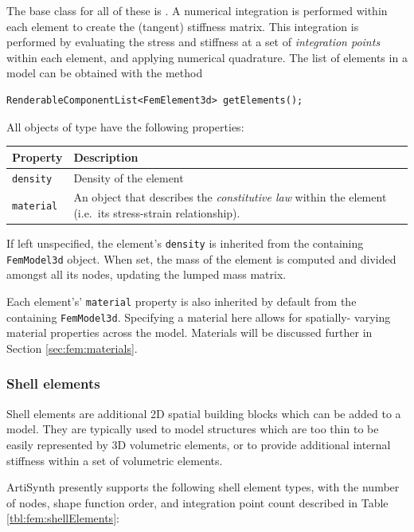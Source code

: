 The base class for all of these is .  A numerical integration is performed within each element
to create the (tangent) stiffness matrix.  This integration is performed
by evaluating the stress and stiffness at a set of \emph{integration points}
within each element, and applying numerical quadrature.  The list of elements
in a model can be obtained with the method
\begin{lstlisting}[]
  RenderableComponentList<FemElement3d> getElements();
\end{lstlisting}

All objects of type  have the 
following properties:
\begin{center}
\begin{tabular}{|ll|}
  \hline
  Property & Description\\
  \hline
  {\tt density} & Density of the element\\
  {\tt material} & An object that describes the \emph{constitutive law} 
                   within the element (i.e.~its stress-strain 
                   relationship).\\
  \hline
\end{tabular}
\end{center}

If left unspecified, the element's {\tt density} is inherited from the 
containing {\tt FemModel3d} object.  When set, the mass of the element is
computed and divided amongst all its nodes, updating the lumped mass
matrix.

Each element's' {\tt material} property is also inherited by default from the 
containing {\tt FemModel3d}. Specifying a material here allows for spatially-%
varying material properties across the model.  Materials will be discussed
further in Section \ref{sec:fem:materials}.

\subsubsection{Shell elements}

Shell elements are additional 2D spatial building blocks which can be
added to a model. They are typically used to model structures which
are too thin to be easily represented by 3D volumetric elements, or to
provide additional internal stiffness within a set of volumetric
elements.

ArtiSynth presently supports the following shell element types, with
the number of nodes, shape function order, and integration point count
described in Table \ref{tbl:fem:shellElements}:

